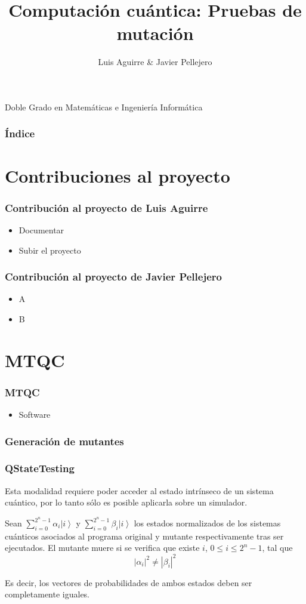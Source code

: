 \documentclass{beamer}
\title{Computación cuántica: Pruebas de mutación}
\author{Luis Aguirre \& Javier Pellejero}
\institute[UCM]{Universidad Complutense de Madrid\\ Facultad de Informática}
\newcommand{\ket}[1]{\left|#1\right\rangle}
\begin{document}
\begin{frame}
	\titlepage
	\begin{center} Doble Grado en Matemáticas e Ingeniería Informática\end{center}
\end{frame}

\begin{frame}
\frametitle{Índice}
	\tableofcontents
\end{frame}

\section{Contribuciones al proyecto}

\begin{frame}
	\frametitle{Contribución al proyecto de Luis Aguirre}
	\begin{itemize}
		\item Documentar
		\item Subir el proyecto
	\end{itemize}
\end{frame}

\begin{frame}
	\frametitle{Contribución al proyecto de Javier Pellejero}
	\begin{itemize}
		\item A
		\item B
	\end{itemize}
\end{frame}

\section{MTQC}
\begin{frame}
	\frametitle{MTQC}
	\begin{itemize}
		\item Software
	\end{itemize}
\end{frame}

\begin{frame}
	\frametitle{Generación de mutantes}
\end{frame}

\begin{frame}
	\frametitle{QStateTesting}
	
	Esta modalidad requiere poder acceder al estado intrínseco de un sistema cuántico, por lo tanto sólo es posible aplicarla sobre un simulador.
	
	Sean $\sum_{i=0}^{2^n-1}\alpha_i\ket{i}$ y $\sum_{i=0}^{2^n-1}\beta_i\ket{i}$ los estados normalizados de los sistemas cuánticos asociados al programa original y mutante respectivamente tras ser ejecutados. El mutante muere si se verifica que existe $i$, $0\leq i\leq 2^n-1$, tal que
	\[|\alpha_i|^2\neq|\beta_i|^2\]
	
	Es decir, los vectores de probabilidades de ambos estados deben ser completamente iguales.
\end{frame}
\end{document}

